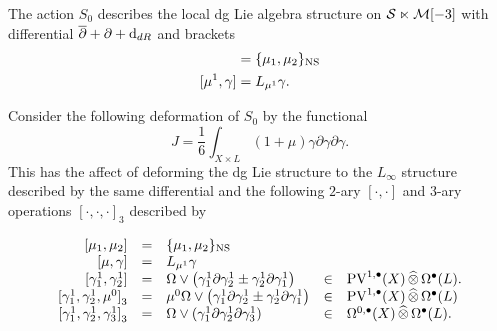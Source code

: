 \documentclass[11pt]{amsart}
\def\PV{{\rm PV}}
\begin{document}
The action $S_0$ describes the local dg Lie algebra structure on $\mathcal S \ltimes \mathcal M[-3]$ with differential $\overline{\partial} + \partial + {\rm d}_{dR}$ and brackets
\begin{align*}
[\mu_1, \mu_2] & = \{\mu_1, \mu_2\}_{\rm NS} \\
[\mu^1, \gamma] & = L_{\mu^1} \gamma .
\end{align*}

Consider the following deformation of $S_0$ by the functional 
\[
J = \frac16 \int_{X \times L} (1 + \mu) \gamma \partial \gamma \partial \gamma .
\]
This has the affect of deforming the dg Lie structure to the $L_\infty$ structure described by the same differential and the following $2$-ary $[\cdot, \cdot]$ and $3$-ary operations $[\cdot, \cdot, \cdot]_3$ described by

\[
\begin{array}{rllllll}
[\mu_1, \mu_2] & = & \{\mu_1, \mu_2\}_{\rm NS} \\
{[\mu, \gamma]} & = &  L_{\mu^1} \gamma \\
{[\gamma^1_1, \gamma^1_2]} & = & \Omega \vee \left(\gamma^1_1 \partial \gamma^1_2 \pm \gamma^1_2 \partial \gamma^1_1\right) & \in & \PV^{1,\bu}(X) \,\Hat{\otimes} \, \Omega^\bu(L) . \\
{[\gamma^1_1, \gamma^1_2 , \mu^0]}_3 & = & \mu^0 \Omega \vee \left(\gamma^1_1 \partial \gamma^1_2 \pm \gamma^1_2 \partial \gamma^1_1\right) & \in & \PV^{1,\bu}(X) \, \Hat{\otimes} \, \Omega^\bu(L) \\
{[\gamma^1_1, \gamma^1_2 , \gamma_3^1]}_3 & = & \Omega \vee (\gamma_1^1 \partial \gamma_2^1 \partial \gamma^1_3) & \in & \Omega^{0,\bu}(X) \, \Hat{\otimes} \,\Omega^\bu(L) .

\end{array}
\]
\end{document}
